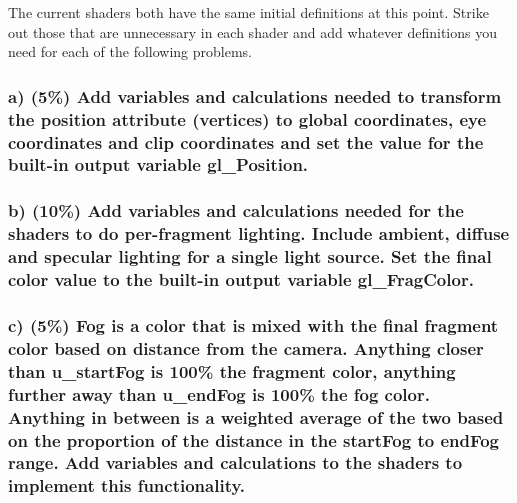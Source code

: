 The current shaders both have the same initial definitions at this point. Strike out those that are unnecessary in each shader and add whatever definitions you need for each of the following problems. 

\subsubsection{a) (5\%) Add variables and calculations needed to transform the position attribute (vertices) to global coordinates, eye coordinates and clip coordinates and set the value for the built-in output variable gl\_Position. }

\subsubsection{b) (10\%) Add variables and calculations needed for the shaders to do per-fragment lighting. Include ambient, diffuse and specular lighting for a single light source.  Set the final color value to the built-in output variable gl\_FragColor.}

\subsubsection{c) (5\%) Fog is a color that is mixed with the final fragment color based on distance from the camera. Anything closer than u\_startFog is 100\% the fragment color, anything further away than u\_endFog is 100\% the fog color. Anything in between is a weighted average of the two based on the proportion of the distance in the startFog to endFog range. Add variables and calculations to the shaders to implement this functionality. }

